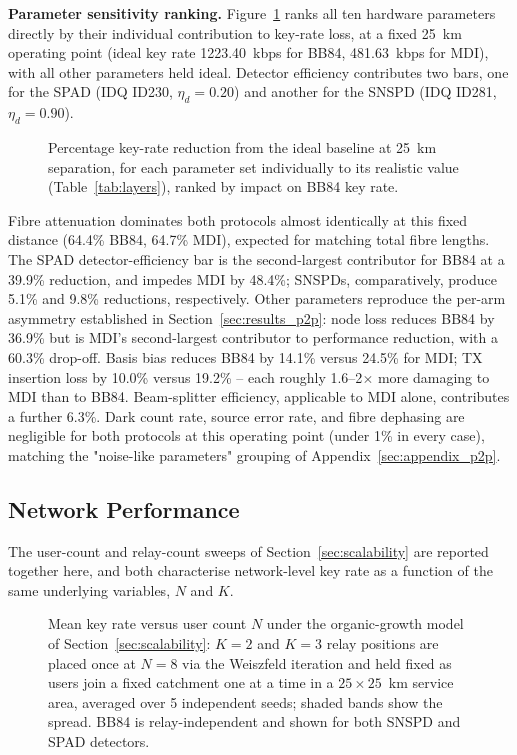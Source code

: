 \documentclass[12pt]{article}
\begin{document}
\textbf{Parameter sensitivity ranking.} Figure~\ref{fig:sensitivity} ranks all ten hardware parameters directly by their individual contribution to key-rate loss, at a fixed 25~km operating point (ideal key rate 1223.40~kbps for BB84, 481.63~kbps for MDI), with all other parameters held ideal. Detector efficiency contributes two bars, one for the SPAD (IDQ ID230, $\eta_d=0.20$) and another for the SNSPD (IDQ ID281, $\eta_d=0.90$).

\begin{figure}[htbp]
    \centering
    \resizebox{0.75\textwidth}{!}{}
    \caption{Percentage key-rate reduction from the ideal baseline at 25~km separation, for each parameter set individually to its realistic value (Table~\ref{tab:layers}), ranked by impact on BB84 key rate.}
    \label{fig:sensitivity}
\end{figure}

Fibre attenuation dominates both protocols almost identically at this fixed distance (64.4\% BB84, 64.7\% MDI), expected for matching total fibre lengths. The SPAD detector-efficiency bar is the second-largest contributor for BB84 at a 39.9\% reduction, and impedes MDI by 48.4\%; SNSPDs, comparatively, produce 5.1\% and 9.8\% reductions, respectively. Other parameters reproduce the per-arm asymmetry established in Section~\ref{sec:results_p2p}: node loss reduces BB84 by 36.9\% but is MDI's second-largest contributor to performance reduction, with a 60.3\% drop-off. Basis bias reduces BB84 by 14.1\% versus 24.5\% for MDI; TX insertion loss by 10.0\% versus 19.2\% -- each roughly 1.6--2$\times$ more damaging to MDI than to BB84. Beam-splitter efficiency, applicable to MDI alone, contributes a further 6.3\%. Dark count rate, source error rate, and fibre dephasing are negligible for both protocols at this operating point (under 1\% in every case), matching the "noise-like parameters" grouping of Appendix~\ref{sec:appendix_p2p}.

\subsection{Network Performance}
\label{sec:results_network}

The user-count and relay-count sweeps of Section~\ref{sec:scalability} are reported together here, and both characterise network-level key rate as a function of the same underlying variables, $N$ and $K$.

\begin{figure}[htbp]
    \centering
    
    \caption{Mean key rate versus user count $N$ under the organic-growth model of Section~\ref{sec:scalability}: $K=2$ and $K=3$ relay positions are placed once at $N=8$ via the Weiszfeld iteration and held fixed as users join a fixed catchment one at a time in a $25\times25$~km service area, averaged over 5 independent seeds; shaded bands show the spread. BB84 is relay-independent and shown for both SNSPD and SPAD detectors.}
    \label{fig:user_sweep}
\end{figure}
\end{document}
